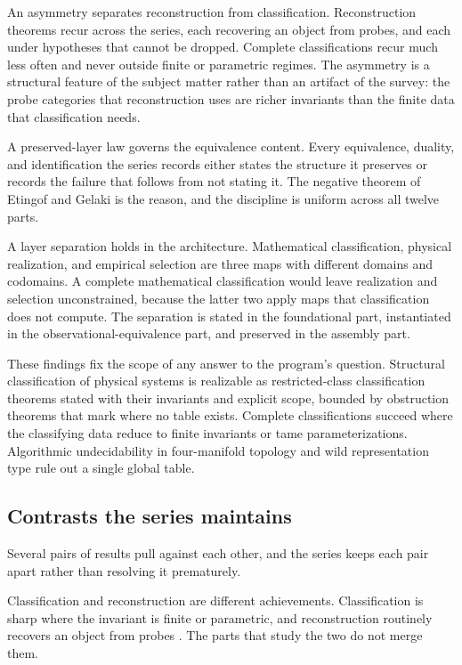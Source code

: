 \documentclass[11pt,letterpaper]{article}
\theoremstyle{definition}
\theoremstyle{remark}
\begin{document}
An asymmetry separates reconstruction from classification. Reconstruction theorems recur across the series, each recovering an object from probes, and each under hypotheses that cannot be dropped. Complete classifications recur much less often and never outside finite or parametric regimes. The asymmetry is a structural feature of the subject matter rather than an artifact of the survey: the probe categories that reconstruction uses are richer invariants than the finite data that classification needs.

A preserved-layer law governs the equivalence content. Every equivalence, duality, and identification the series records either states the structure it preserves or records the failure that follows from not stating it. The negative theorem of Etingof and Gelaki \cite{corpus-74} is the reason, and the discipline is uniform across all twelve parts.

A layer separation holds in the architecture. Mathematical classification, physical realization, and empirical selection are three maps with different domains and codomains. A complete mathematical classification would leave realization and selection unconstrained, because the latter two apply maps that classification does not compute. The separation is stated in the foundational part, instantiated in the observational-equivalence part, and preserved in the assembly part.

These findings fix the scope of any answer to the program's question. Structural classification of physical systems is realizable as restricted-class classification theorems stated with their invariants and explicit scope, bounded by obstruction theorems that mark where no table exists. Complete classifications succeed where the classifying data reduce to finite invariants or tame parameterizations. Algorithmic undecidability in four-manifold topology and wild representation type rule out a single global table.

\subsection{Contrasts the series maintains}

Several pairs of results pull against each other, and the series keeps each pair apart rather than resolving it prematurely.

Classification and reconstruction are different achievements. Classification is sharp where the invariant is finite or parametric, and reconstruction routinely recovers an object from probes \cite{corpus-42,corpus-43,corpus-44,corpus-12,corpus-13}. The parts that study the two do not merge them.
\end{document}
